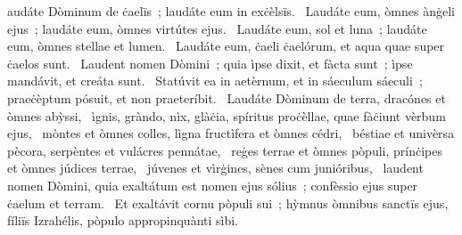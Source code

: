 \psalmChapterWithInscription{}
{ }
{%
audáte Dòminum de ċaelïs~; laudáte eum in exċèlsïs. 
~Laudáte eum, òmnes ànġeli ejus~; laudáte eum, òmnes virtútes ejus. 
~Laudáte eum, sol et luna~; laudáte eum, òmnes stellae et lumen. 
~Laudáte eum, ċaeli ċaelórum, et aqua quae super ċaelos sunt. 
~Laudent nomen Dòmini~; quia ìpse dixit, et fàcta sunt~; ìpse mandávit, et creáta sunt. 
~Statúvit ea in aetèrnum, et in sáeculum sáeculi~; praeċèptum pósuit, et non praeteríbit. 
~Laudáte Dòminum de terra, dracónes et òmnes abỳssi, 
~ìgnis, gràndo, nìx, glàċia, spíritus proċèllae, quae fàċiunt vèrbum ejus, 
~mòntes et òmnes colles, lìgna fructìfera et òmnes cédri, 
~béstiae et univèrsa pècora, serpèntes et vulácres pennátae, 
~reġes terrae et òmnes pòpuli, prínċipes et òmnes júdices terrae, 
~júvenes et vìrġines, sènes cum junióribus, 
~laudent nomen Dòmini, quia exaltátum est nomen ejus sólius~; confèssio ejus super ċaelum et terram. 
~Et exaltávit cornu pòpuli sui~; hỳmnus òmnibus sanctïs ejus, fíliïs Izrahélis, pòpulo appropinquànti sìbi. 
}
